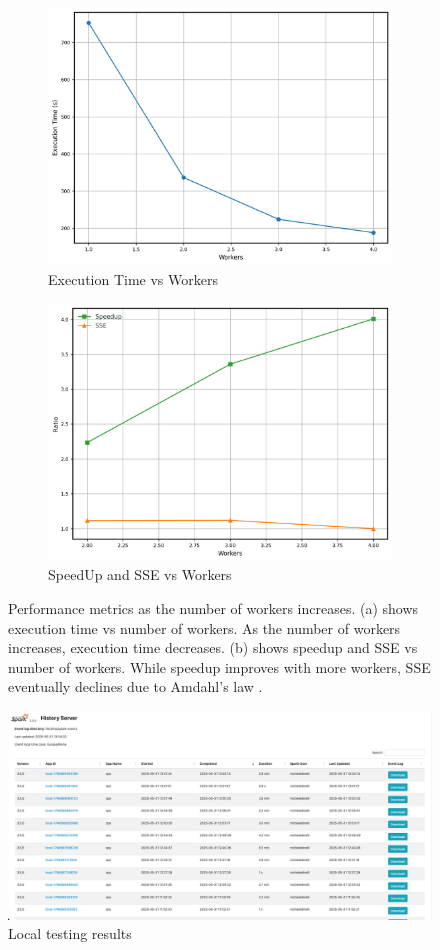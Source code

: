 \documentclass[conference]{IEEEtran}
\begin{document}
\begin{figure}[htpb]
  \centering
  \begin{subfigure}[b]{0.49\textwidth}
    \centering
    \includegraphics[width=0.7\linewidth]{execution_time.png}
    \caption{Execution Time vs Workers}
    \label{fig:sub1}
  \end{subfigure}
  \hfill
  \begin{subfigure}[b]{0.49\textwidth}
    \centering
    \includegraphics[width=0.7\linewidth]{speedup-sse.png}
    \caption{SpeedUp and SSE vs Workers}
    \label{fig:sub2}
  \end{subfigure}
  \caption{Performance metrics as the number of workers increases. (a) shows execution time vs number of workers. As the number of workers increases, execution time decreases. (b) shows speedup and SSE vs number of workers. While speedup improves with more workers, SSE eventually declines due to Amdahl's law \cite{10.1145/1465482.1465560}.}
  \label{fig:results}
\end{figure}

\begin{figure}[htpb]
    \centering
    \includegraphics[width=\linewidth]{local-testing.png}
    \caption{Local testing results}
    \label{fig:local-testing}
\end{figure}
\end{document}
